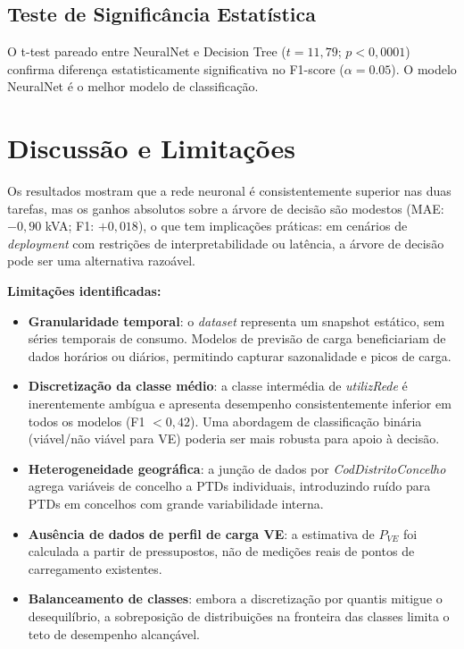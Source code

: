 \documentclass[conference]{IEEEtran}
\begin{document}
\subsection{Teste de Significância Estatística}

O t-test pareado entre NeuralNet e Decision Tree ($t = 11,79$; $p < 0,0001$) confirma diferença estatisticamente significativa no F1-score ($\alpha = 0.05$). O modelo NeuralNet é o melhor modelo de classificação.

\section{Discussão e Limitações}

Os resultados mostram que a rede neuronal é consistentemente superior nas duas tarefas, mas os ganhos absolutos sobre a árvore de decisão são modestos (MAE: $-0,90$ kVA; F1: $+0,018$), o que tem implicações práticas: em cenários de \textit{deployment} com restrições de interpretabilidade ou latência, a árvore de decisão pode ser uma alternativa razoável.

\textbf{Limitações identificadas:}

\begin{itemize}
    \item \textbf{Granularidade temporal}: o \textit{dataset} representa um snapshot estático, sem séries temporais de consumo. Modelos de previsão de carga beneficiariam de dados horários ou diários, permitindo capturar sazonalidade e picos de carga.
    \item \textbf{Discretização da classe médio}: a classe intermédia de \textit{utilizRede} é inerentemente ambígua e apresenta desempenho consistentemente inferior em todos os modelos (F1 $< 0,42$). Uma abordagem de classificação binária (viável/não viável para VE) poderia ser mais robusta para apoio à decisão.
    \item \textbf{Heterogeneidade geográfica}: a junção de dados por \textit{CodDistritoConcelho} agrega variáveis de concelho a PTDs individuais, introduzindo ruído para PTDs em concelhos com grande variabilidade interna.
    \item \textbf{Ausência de dados de perfil de carga VE}: a estimativa de $P_{VE}$ foi calculada a partir de pressupostos, não de medições reais de pontos de carregamento existentes.
    \item \textbf{Balanceamento de classes}: embora a discretização por quantis mitigue o desequilíbrio, a sobreposição de distribuições na fronteira das classes limita o teto de desempenho alcançável.
\end{itemize}
\end{document}
